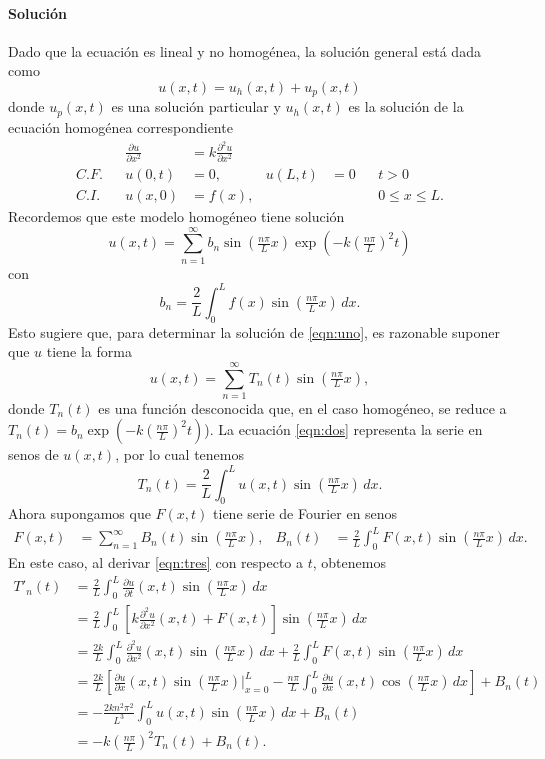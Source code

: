\documentclass[11pt,letterpaper]{report}
\newcommand\<{\langle}
\renewcommand\>{\rangle}
\begin{document}
\paragraph{Solución}
Dado que la ecuación es lineal y no homogénea, la solución general
está dada como
\[
  u(x,t) = u_h(x,t)+u_p(x,t)
\]
donde $u_p(x,t)$ es una solución particular y
$u_h(x,t)$ es la solución de la ecuación homogénea correspondiente
\begin{align*}
  && \frac{\partial u}{\partial x^2}
  &=k \frac{\partial^2 u}{\partial x^2} \\
  C.F. && u(0,t) &= 0, & u(L,t)&= 0 && t>0 \\
  C.I. && u(x,0) &= f(x), &&&& 0\leq x\leq L.
\end{align*}
Recordemos que este modelo homogéneo tiene solución
\[
  u(x,t)
  =
  \sum_{n=1}^{\infty}b_n\sin(\tfrac{n\pi}{L}x)
  \exp(-k(\tfrac{n\pi}{L})^2t)
\]
con
\[
  b_n=\frac{2}{L}\int_{0}^{L}f(x)\sin(\tfrac{n\pi}{L}x)\,dx
.\]
Esto sugiere que, para determinar la solución de \eqref{eqn:uno},
es razonable suponer que $u$ tiene la forma
\begin{equation}\label{eqn:dos}
  u(x,t) = \sum_{n=1}^{\infty}T_n(t)\sin(\tfrac{n\pi}{L}x),
\end{equation}
donde $T_n(t)$ es una función desconocida que, en el caso homogéneo,
se reduce a $T_n(t)=b_n\exp(-k(\tfrac{n\pi}{L})^2t)$).
La ecuación \eqref{eqn:dos} representa la serie en senos de $u(x,t)$,
por lo cual tenemos
\begin{equation}\label{eqn:tres}
  T_n(t) = \frac{2}{L} \int_{0}^{L}u(x,t)\sin(\tfrac{n\pi}{L}x)\,dx.
\end{equation}
Ahora supongamos que $F(x,t)$ tiene serie de Fourier en senos
\begin{align*}
  F(x,t)
  &= \sum_{n=1}^{\infty}B_n(t)\sin(\tfrac{n\pi}{L}x),
  &B_n(t)
  &= \frac{2}{L}\int_{0}^{L}F(x,t)\sin(\tfrac{n\pi}{L}x)\,dx.
\end{align*}
En este caso, al derivar \eqref{eqn:tres} con respecto a $t$, obtenemos
\begin{align*}
  T'_n(t)
  &=
  \frac{2}{L}\int_{0}^{L}\frac{\partial u}{\partial t}(x,t)
  \sin(\tfrac{n\pi}{L}x)\,dx \\
  &=
  \frac{2}{L}\int_{0}^{L}
  \left[
  k \frac{\partial^2u}{\partial x^2}(x,t)+F(x,t)
          \right]
  \sin(\tfrac{n\pi}{L}x)\,dx \\
  &=
  \frac{2k}{L}\int_{0}^{L}
  \frac{\partial^2u}{\partial x^2}(x,t)
  \sin(\tfrac{n\pi}{L}x)\,dx
  +
  \frac{2}{L}\int_{0}^{L}
  F(x,t)
  \sin(\tfrac{n\pi}{L}x)\,dx \\
  &=
  \frac{2k}{L}\left[
    \frac{\partial u}{\partial x}(x,t)\sin(\tfrac{n\pi}{L}x)\Big|_{x=0}^L
    -
    \frac{n\pi}{L}\int_{0}^{L}\frac{\partial u}{\partial x}(x,t)
    \cos(\tfrac{n\pi}{L}x)\,dx
  \right]
  +B_n(t) \\
  &=
  -\frac{2kn^2\pi^2}{L^3}\int_{0}^{L}u(x,t)\sin(\tfrac{n\pi}{L}x)\,dx
  +B_n(t) \\
  &= -k(\tfrac{n\pi}{L})^2T_n(t)+B_n(t).
\end{align*}
\end{document}
